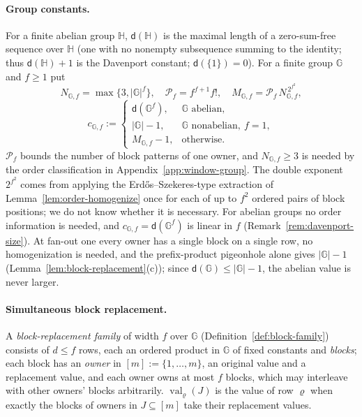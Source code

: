 \documentclass[11pt]{article}
\numberwithin{equation}{section}
\theoremstyle{plain}
\theoremstyle{definition}
\theoremstyle{remark}
\theoremstyle{plain}
\begin{document}
\paragraph{Group constants.}
For a finite abelian group ${\mathbb H}$, $\mathsf d({\mathbb H})$ is the maximal length of a
zero-sum-free sequence over ${\mathbb H}$ (one with no nonempty subsequence summing
to the identity; thus $\mathsf d({\mathbb H})+1$ is the Davenport constant;
$\mathsf d(\{1\})=0$).  For a finite group ${\mathbb G}$ and $f\ge1$ put
\[
 N_{{\mathbb G},f}=\max\{3,|{\mathbb G}|^f\},\quad
 \mathcal P_f=f^{f+1}f!,\quad
 M_{{\mathbb G},f}=\mathcal P_f\,N_{{\mathbb G},f}^{\,2^{f^2}},
\]
\[
 c_{{\mathbb G},f}:=
 \begin{cases}
 \mathsf d({\mathbb G}^f),&{\mathbb G}\text{ abelian},\\
 |{\mathbb G}|-1,&{\mathbb G}\text{ nonabelian},\ f=1,\\
 M_{{\mathbb G},f}-1,&\text{otherwise}.
 \end{cases}
\]
$\mathcal P_f$ bounds the number of block patterns of one owner, and $N_{{\mathbb G},f}\ge3$ is
needed by the order classification in Appendix~\ref{app:window-group}.  The
double exponent $2^{f^2}$ comes from applying the Erd\H{o}s--Szekeres-type
extraction of Lemma~\ref{lem:order-homogenize} once for each of up to $f^2$
ordered pairs of block positions; we do not know whether it is necessary.
For abelian groups no order information is needed, and
$c_{{\mathbb G},f}=\mathsf d({\mathbb G}^f)$ is linear in $f$
(Remark~\ref{rem:davenport-size}).  At fan-out one every owner has a single block
on a single row, no homogenization is needed, and the prefix-product pigeonhole
alone gives $|{\mathbb G}|-1$ (Lemma~\ref{lem:block-replacement}(c)); since
$\mathsf d({\mathbb G})\le|{\mathbb G}|-1$, the abelian value is never larger.

\paragraph{Simultaneous block replacement.}
A \emph{block-replacement family} of width $f$ over ${\mathbb G}$
(Definition~\ref{def:block-family}) consists of $d\le f$ rows, each an ordered
product in ${\mathbb G}$ of fixed constants and \emph{blocks}; each block has an
\emph{owner} in $[m]:=\{1,\ldots,m\}$, an original value and a replacement value, and each owner
owns at most $f$ blocks, which may interleave with other owners' blocks
arbitrarily.  $\operatorname{val}_\varrho(J)$ is the value of row $\varrho$ when exactly the
blocks of owners in $J\subseteq[m]$ take their replacement values.
\end{document}
